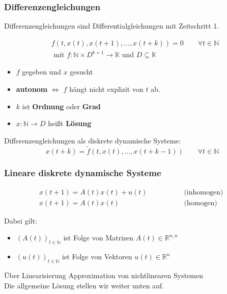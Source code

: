 \documentclass[a4paper]{article}
\newcommand{\R}{\mathbb{R}}
\newcommand{\N}{\mathbb{N}}
\begin{document}
\subsubsection{Differenzengleichungen}
Differenzengleichungen sind Differentialgleichungen
mit Zeitschritt 1.

\begin{align*}
	& f(t, x(t), x(t+1), ..., x(t+k)) = 0 \qquad
	\forall t \in \mathbb{N} \\
	& \text{ mit } f: \N \times D^{k+1} \rightarrow \mathbb{K}
	\text{ und } D \subseteq \mathbb{K}
\end{align*}

\begin{itemize}
	\item $f$ gegeben und $x$ gesucht
	\item \textbf{autonom} $\Leftrightarrow$ 
		$f$ hängt nicht explizit von $t$ ab.
	\item $k$ ist \textbf{Ordnung} oder \textbf{Grad} 
	\item $x: \N \rightarrow D$ heißt \textbf{Lösung}
\end{itemize}

Differenzengleichungen als diskrete dynamische Systeme:
\[
	x(t+k) = \tilde{f} \left(
		t, x(t), ..., x(t+k-1)
	\right) \qquad
	\forall t \in \mathbb{N} 
\] 

\subsubsection{Lineare diskrete dynamische Systeme}

\begin{align*}
	x(t+1) = A(t) x(t) + u(t)
	\qquad \qquad & \text{ (inhomogen) } \\
	x(t+1) = A(t) x(t)
	\qquad \qquad & \text{ (homogen) }
\end{align*}

Dabei gilt:

\begin{itemize}
	\item $(A(t))_{t \in \mathbb{N}}$
		ist Folge von Matrizen $A(t) \in \R ^{n, n}$
	\item $(u(t))_{t \in \mathbb{N}}$ ist Folge von Vektoren 
		$u(t) \in \R ^{n}$
\end{itemize}

Über Linearisierung Approximation von nichtlinearen Systemen
\\

Die allgemeine Lösung stellen wir weiter unten auf.
\end{document}
